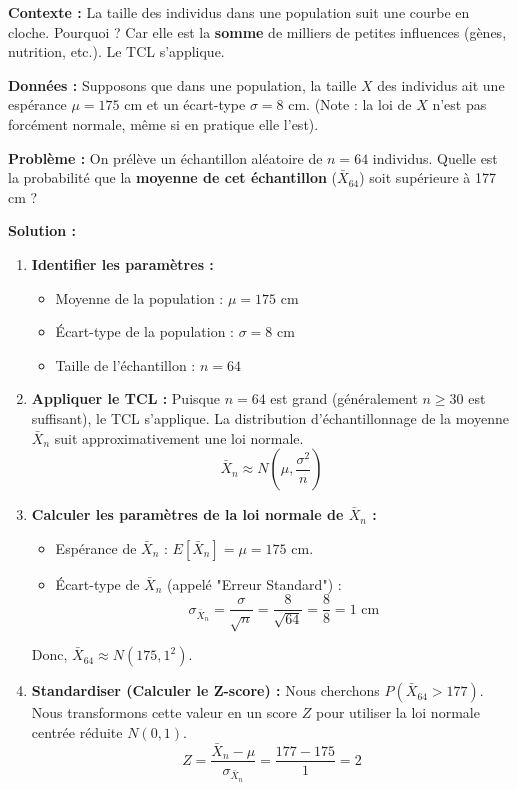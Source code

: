 \begin{examplebox}
\textbf{Contexte :} La taille des individus dans une population suit une courbe en cloche. Pourquoi ? Car elle est la \textbf{somme} de milliers de petites influences (gènes, nutrition, etc.). Le TCL s'applique.

\textbf{Données :} Supposons que dans une population, la taille $X$ des individus ait une espérance $\mu = 175$ cm et un écart-type $\sigma = 8$ cm. (Note : la loi de $X$ n'est pas forcément normale, même si en pratique elle l'est).

\textbf{Problème :} On prélève un échantillon aléatoire de $n=64$ individus. Quelle est la probabilité que la \textbf{moyenne de cet échantillon} ($\bar{X}_{64}$) soit supérieure à 177 cm ?

\textbf{Solution :}
\begin{enumerate}
    \item \textbf{Identifier les paramètres :}
    \begin{itemize}
        \item Moyenne de la population : $\mu = 175$ cm
        \item Écart-type de la population : $\sigma = 8$ cm
        \item Taille de l'échantillon : $n = 64$
    \end{itemize}
    
    \item \textbf{Appliquer le TCL :}
    Puisque $n=64$ est grand (généralement $n \ge 30$ est suffisant), le TCL s'applique. La distribution d'échantillonnage de la moyenne $\bar{X}_n$ suit approximativement une loi normale.
    $$ \bar{X}_n \approx N\left(\mu, \frac{\sigma^2}{n}\right) $$
    
    \item \textbf{Calculer les paramètres de la loi normale de $\bar{X}_n$ :}
    \begin{itemize}
        \item Espérance de $\bar{X}_n$ : $E[\bar{X}_n] = \mu = 175$ cm.
        \item Écart-type de $\bar{X}_n$ (appelé "Erreur Standard") :
        $$ \sigma_{\bar{X}_n} = \frac{\sigma}{\sqrt{n}} = \frac{8}{\sqrt{64}} = \frac{8}{8} = 1 \text{ cm} $$
    \end{itemize}
    Donc, $\bar{X}_{64} \approx N(175, 1^2)$.
    
    \item \textbf{Standardiser (Calculer le Z-score) :}
    Nous cherchons $P(\bar{X}_{64} > 177)$. Nous transformons cette valeur en un score $Z$ pour utiliser la loi normale centrée réduite $N(0, 1)$.
    $$ Z = \frac{\bar{X}_n - \mu}{\sigma_{\bar{X}_n}} = \frac{177 - 175}{1} = 2 $$
    

\end{enumerate}
\end{examplebox}
